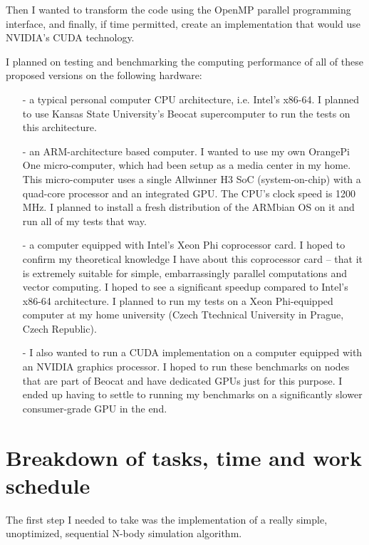 \documentclass[journal]{IEEEtran}
\begin{document}
		Then I wanted to transform the code using the OpenMP parallel programming interface, and finally, if time permitted, create an implementation that would use NVIDIA's CUDA technology.
		
		I planned on testing and benchmarking the computing performance of all of these proposed versions on the following hardware:
		
		\begin{itemize}  
			\item[-]{a typical personal computer CPU architecture, i.e. Intel’s x86-64. I planned to use Kansas State University’s Beocat supercomputer to run the tests on this architecture.}
			
			\item[-]{an ARM-architecture based computer. I wanted to use my own OrangePi One micro-computer, which had been  setup as a media center in my home. This micro-computer uses a single Allwinner H3 SoC (system-on-chip) with a quad-core processor and an integrated GPU. The CPU's clock speed is 1200 MHz. I planned to install a fresh distribution of the ARMbian OS on it and run all of my tests that way.}
			
			\item[-]{a computer equipped with Intel’s Xeon Phi coprocessor card. I hoped to confirm my theoretical knowledge I have about this coprocessor card – that it is extremely suitable for simple, embarrassingly parallel computations and vector computing. I hoped to see a significant speedup compared to Intel’s x86-64 architecture. I planned to run my tests on a Xeon Phi-equipped computer at my home university (Czech Ttechnical University in Prague, Czech Republic).}
			
			\item[-]{I also wanted to run a CUDA implementation on a computer equipped with an NVIDIA graphics processor. I hoped to run these benchmarks on nodes that are part of Beocat and have dedicated GPUs just for this purpose. I ended up having to settle to running my benchmarks on a significantly slower consumer-grade GPU in the end.}
		\end{itemize}
	
	\section{Breakdown of tasks, time and work schedule}
	
		The first step I needed to take was the implementation of a really simple, unoptimized, sequential N-body simulation algorithm. 
		
\end{document}
